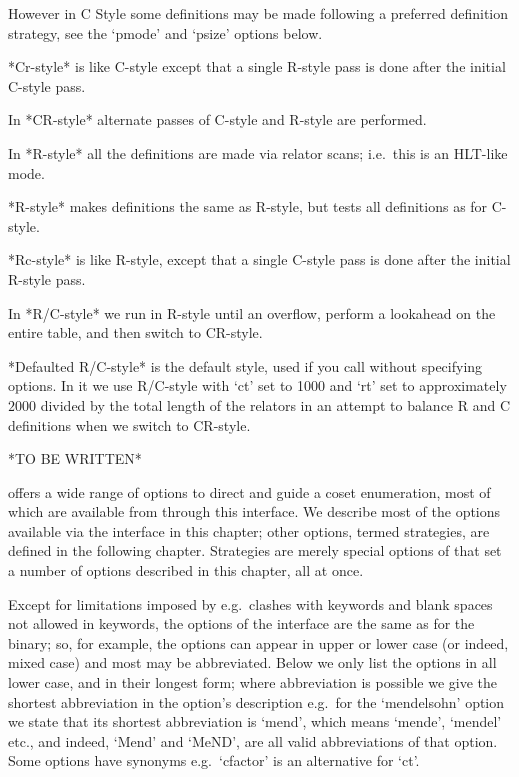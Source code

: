 However in C Style some  definitions may be made following a preferred
definition strategy, see the `pmode' and `psize' options below.

*Cr-style* is like  C-style except that a single R-style  pass is done
after the initial C-style pass.

In *CR-style* alternate passes of C-style and R-style are performed.

In *R-style*  all   the  definitions  are   made  via  relator  scans; 
i.e.~this is an HLT-like mode.

*R\*-style*  makes  definitions the  same as  R-style,  but  tests all
definitions as for C-style.

*Rc-style* is like R-style, except  that a single C-style pass is done
after the initial R-style pass.

In  *R/C-style*  we  run  in  R-style  until  an  overflow, perform  a
lookahead on the entire table, and then switch to CR-style.

*Defaulted R/C-style*  is the default  style, used if  you call {\ACE}
without specifying  options. In it we  use R/C-style with  `ct' set to
1000 and `rt' set to  approximately $2000$ divided by the total length
of the relators  in an attempt to balance R and  C definitions when we
switch to CR-style.


*TO BE WRITTEN*



{\ACE} offers  a wide  range of  options to direct  and guide  a coset
enumeration,  most of  which are  available from  {\GAP}  through this
interface. We describe most of the options available via the interface
in this chapter; other options, termed strategies, are defined in  the
following chapter.  Strategies  are  merely special options of  {\ACE}
that set a number of options described in this chapter,  all  at once.

Except for limitations imposed  by {\GAP}  e.g.\ clashes  with {\GAP}
keywords and blank spaces not allowed in keywords, the options of the
{\ACE} interface are the same as for the binary; so, for example, the
options can appear in upper or lower case (or indeed, mixed case) and
most may be abbreviated. Below we only list the options in all  lower
case, and in their longest form;  where  abbreviation is possible  we
give the shortest abbreviation in the option's description   e.g.~for
the `mendelsohn' option we state that  its  shortest  abbreviation is
`mend', which means `mende', `mendel' etc., and  indeed,  `Mend'  and
`MeND', are all valid abbreviations of that option. Some options have
synonyms e.g.~`cfactor' is an alternative for `ct'.

